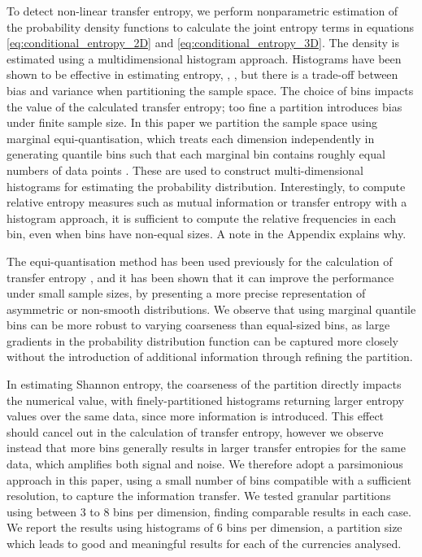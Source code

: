 \documentclass[]{rsos}%
\begin{document}
  To detect non-linear transfer entropy, we perform nonparametric estimation of the probability density functions to calculate the joint entropy terms in equations \ref{eq:conditional_entropy_2D} and \ref{eq:conditional_entropy_3D}. The density is estimated using a multidimensional histogram approach. Histograms have been shown to be effective in estimating entropy, \cite{boba2015efficient}, \cite{Marschinski2002}, but there is a trade-off between bias and variance when partitioning the sample space. The choice of bins impacts the value of the calculated transfer entropy; too fine a partition introduces bias under finite sample size. In this paper we partition the sample space using marginal equi-quantisation, which treats each dimension independently in generating quantile bins such that each marginal bin contains roughly equal numbers of data points \cite{hlavavckova2007causality}. These are used to construct multi-dimensional histograms for estimating the probability distribution. 
Interestingly, to compute relative entropy measures such as mutual information or transfer entropy with a histogram approach, it is sufficient to compute the relative frequencies in each bin, even when bins have non-equal sizes. A note in the Appendix explains why.
  
  The equi-quantisation method has been used previously for the calculation of transfer entropy \cite{hlavavckova2007causality} \cite{darbellay1999estimation}, \cite{Marschinski2002} and it has been shown that it can improve the performance under small sample sizes, by presenting a more precise representation of asymmetric or non-smooth distributions. We observe that using marginal quantile bins can be more robust to varying coarseness than equal-sized bins, as large gradients in the probability distribution function can be captured more closely without the introduction of additional information through refining the partition. 
   

  In estimating Shannon entropy, the coarseness of the partition directly impacts the numerical value, with finely-partitioned histograms returning larger entropy values over the same data, since more information is introduced. This effect should cancel out in the calculation of transfer entropy, however we observe instead that more bins generally results in larger transfer entropies for the same data, which amplifies both signal and noise. We therefore adopt a parsimonious approach in this paper, using a small number of bins compatible with a sufficient resolution, to capture the information transfer. 
  We tested granular partitions using between 3 to 8 bins per dimension, finding comparable results in each case. We report the results using histograms of 6 bins per dimension, a partition size which leads to good and meaningful results for each of the currencies analysed.
\end{document}
